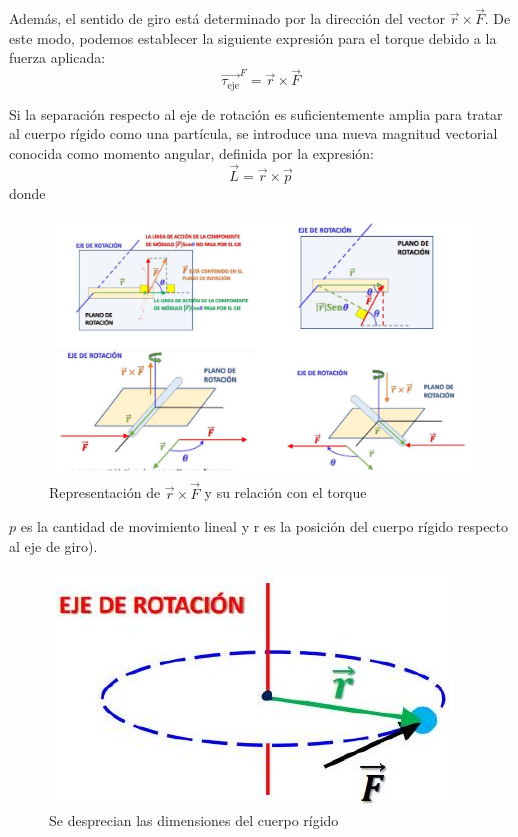 \documentclass[10pt]{article}
\begin{document}
Además, el sentido de giro está determinado por la dirección del vector $\vec{r} \times \vec{F}$.  
De este modo, podemos establecer la siguiente expresión para el torque debido a la fuerza aplicada:  
\[
{\overrightarrow{\tau_{\text{eje}}}}^{F} = \vec{r} \times \vec{F}
\]  

Si la separación respecto al eje de rotación es suficientemente amplia para tratar al cuerpo rígido como una partícula, se introduce una nueva magnitud vectorial conocida como momento angular, definida por la expresión:
\[
\vec{L} = \vec{r} \times \vec{p}
\]
donde
\begin{figure}[H]
    \centering
\includegraphics[scale = 0.30, center]{2025_04_01_ea720b93e8ebb5d0c6aeg-07(1)}
\caption{Representación de $\vec{r} \times \vec{F}$ y su relación con el torque}
\end{figure}

$p$ es la cantidad de movimiento lineal y r es la posición del cuerpo rígido respecto al eje de giro).\\

\begin{figure}[H]
    \centering
\includegraphics[scale = 0.30, center]{2025_04_01_ea720b93e8ebb5d0c6aeg-07}
\caption{Se desprecian las dimensiones del cuerpo rígido }
\end{figure}
\end{document}
